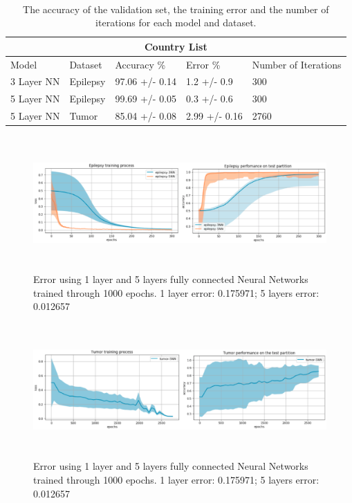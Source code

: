 \documentclass{llncs}       %
\begin{document}
\paragraph{}

\begin{table}[h!]
\begin{tabular}{ |p{3cm}||p{2cm}|p{2cm}|p{2cm}|p{1.5cm}|  }
 \hline
 \multicolumn{5}{|c|}{Country List} \\
 \hline
 Model     & Dataset &Accuracy \%&Error \%& Number of Iterations\\
 \hline
 3 Layer NN & Epilepsy &97.06 +/- 0.14& 1.2 +/- 0.9 &300\\
 5 Layer NN & Epilepsy  & 99.69 +/- 0.05   &0.3 +/- 0.6 &300\\
 5 Layer NN & Tumor & 85.04 +/- 0.08 &  2.99 +/- 0.16 &2760\\
 \hline
\end{tabular}
\caption{ The accuracy of the validation set, the training error and the number of iterations for each model and dataset.}
\end{table}



\begin{figure}[h]
\centering
\includegraphics[width=12.08cm,height=5.11cm]{media/results.eps}
\caption{ Error using 1 layer and 5 layers fully connected Neural Networks trained through 1000 epochs. 1 layer error:  0.175971;  5 layers error:  0.012657}
\end{figure}



\begin{figure}[h]
\centering
\includegraphics[width=12.08cm,height=5.11cm]{media/results2.eps}
\caption{ Error using 1 layer and 5 layers fully connected Neural Networks trained through 1000 epochs. 1 layer error:  0.175971;  5 layers error:  0.012657}
\end{figure}
\end{document}
